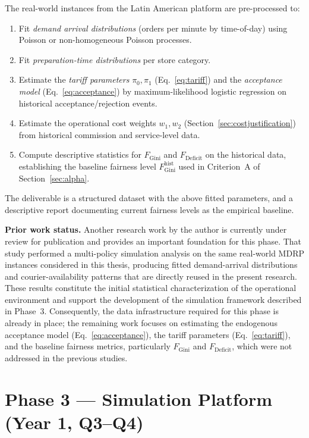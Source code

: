 \documentclass[12pt,a4paper]{report}
\begin{document}
The real-world instances from the Latin American platform are pre-processed to:
\begin{enumerate}
    \item Fit \emph{demand arrival distributions} (orders per minute by time-of-day) using Poisson or non-homogeneous Poisson processes.
    \item Fit \emph{preparation-time distributions} per store category.
    \item Estimate the \emph{tariff parameters} $\pi_0, \pi_1$ (Eq.~\ref{eq:tariff}) and the \emph{acceptance model} (Eq.~\ref{eq:acceptance}) by maximum-likelihood logistic regression on historical acceptance/rejection events.
    \item Estimate the operational cost weights $w_1, w_2$ (Section~\ref{sec:costjustification}) from historical commission and service-level data.
    \item Compute descriptive statistics for $F_\text{Gini}$ and $F_\text{Deficit}$ on the historical data, establishing the baseline fairness level $F_{\text{Gini}}^{\text{hist}}$ used in Criterion~A of Section~\ref{sec:alpha}.
\end{enumerate}

\noindent The deliverable is a structured dataset with the above fitted parameters, and a descriptive report documenting current fairness levels as the empirical baseline.

\noindent\textbf{Prior work status.} Another research work by the author is currently under review for publication and provides an important foundation for this phase. That study performed a multi-policy simulation analysis on the same real-world MDRP instances considered in this thesis, producing fitted demand-arrival distributions and courier-availability patterns that are directly reused in the present research. These results constitute the initial statistical characterization of the operational environment and support the development of the simulation framework described in Phase~3. Consequently, the data infrastructure required for this phase is already in place; the remaining work focuses on estimating the endogenous acceptance model (Eq.~\ref{eq:acceptance}), the tariff parameters (Eq.~\ref{eq:tariff}), and the baseline fairness metrics, particularly $F_\text{Gini}$ and $F_\text{Deficit}$, which were not addressed in the previous studies.

\section{Phase 3 --- Simulation Platform (Year 1, Q3--Q4)}
\label{sec:phase3}
\end{document}
